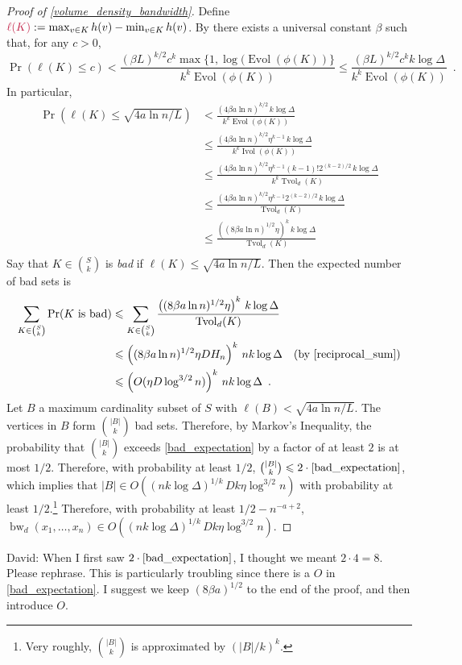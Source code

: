 \documentclass{patmorin}
\makeatletter
\renewcommand{\le}{\leqslant}
\newcommand{\david}[1]{{\color{orange} David: #1}}
\newcommand{\defin}[1]{\emph{\textcolor{brightmaroon}{#1}}}
\def\mathcolor#1#{\@mathcolor{#1}}
\def\@mathcolor#1#2#3{%
  \protect\leavevmode
  \begingroup
    \color#1{#2}#3%
  \endgroup
}
\newcommand{\mathdefin}[1]{\mathcolor{brightmaroon}{#1}}
\DeclareMathOperator{\bw}{bw}
\DeclareMathOperator{\evol}{Evol}
\DeclareMathOperator{\ivol}{Ivol}
\DeclareMathOperator{\tvol}{Tvol}
\makeatother
\begin{document}
\begin{proof}[Proof of \cref{volume_density_bandwidth}]
  Define $\mathdefin{\ell(K)}:=\max_{v\in K}h(v)-\min_{v\in K} h(v)$.  By \cite[Theorem~9]{feige:approximating} there exists a universal constant $\beta$ such that, for any $c>0$,
  \[
      \Pr(\ell(K) \le c)
        < \frac{(\beta L)^{k/2}c^k\max\{1,\log(\evol(\phi(K))\}}{k^k\evol(\phi(K))}
        \le \frac{(\beta L)^{k/2}c^kk\log\Delta}{k^k\evol(\phi(K))} \enspace .
  \]
  In particular,
  \begin{align*}
    \Pr(\ell(K) \le \sqrt{4a\ln n/L})
      & <
      \frac{(4\beta a\ln n)^{k/2}\, k\log\Delta}{k^k\evol(\phi(K))} \\
      & \le \frac{(4\beta a\ln n)^{k/2}\eta^{k-1}\, k\log\Delta}{k^k\ivol(\phi(K))} \\
      & \le \frac{(4\beta a\ln n)^{k/2}\eta^{k-1}(k-1)!2^{(k-2)/2}\, k\log\Delta}{k^k\tvol_{d}(K)} \\
      & \le \frac{(4\beta a\ln n)^{k/2}\eta^{k-1}2^{(k-2)/2}\,k\log\Delta}{\tvol_{d}(K)} \\
      & \le \frac{\left((8\beta a\ln n)^{1/2}\eta\right)^{k}\,k\log\Delta}{\tvol_{d}(K)} \\
  \end{align*}
  Say that $K\in\binom{S}{k}$ is \defin{bad} if $\ell(K) \le \sqrt{4a\ln n/L}$. Then the expected number of bad sets is
  \begin{align}
    \sum_{K\in \binom{S}{k}} \Pr(\text{$K$ is bad})
    & \le \sum_{K\in \binom{S}{k}} \frac{\left((8\beta a\ln n)^{1/2}\eta\right)^{k}\, k\log\Delta}{\tvol_{d}(K)} \notag \\
    & \le \left((8\beta a\ln n)^{1/2}\eta DH_n\right)^{k}\, nk\log\Delta
    & \text{(by \cref{reciprocal_sum})} \notag \\
    & \le \left(O(\eta D\log^{3/2}n)\right)^{k}\, nk\log\Delta \enspace .
    \label{bad_expectation}
  \end{align}
  Let $B$ a maximum cardinality subset of $S$ with $\ell(B)<\sqrt{4a\ln n/L}$.  The vertices in $B$ form $\binom{|B|}{k}$ bad sets. Therefore, by Markov's Inequality, the probability that $\binom{|B|}{k}$ exceeds \eqref{bad_expectation} by a factor of at least $2$ is at most $1/2$.  Therefore, with probability at least $1/2$, $\binom{|B|}{k}\le 2\cdot\eqref{bad_expectation}$, which implies that $|B|\in O((nk\log\Delta)^{1/k}\,Dk\eta\log^{3/2} n)$ with probability at least $1/2$.\footnote{Very roughly, $\binom{|B|}{k}$ is approximated by $(|B|/k)^k$.}  Therefore, with probability at least $1/2-n^{-a+2}$, $\bw_d(x_1,\ldots,x_n)\in O((nk\log\Delta)^{1/k}\,Dk\eta\log^{3/2} n)$.
\end{proof}

\david{When I first saw $2\cdot\eqref{bad_expectation}$, I thought we meant $2\cdot 4= 8$. Please rephrase. This is particularly troubling since there is a $O$ in \eqref{bad_expectation}. I suggest we keep $(8\beta a)^{1/2}$ to the end of the proof, and then introduce $O$.}
\end{document}
